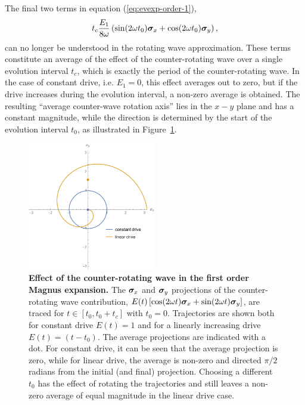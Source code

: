 The final two terms in equation (\ref{eq:evexp-order-1}),
\begin{align}
	t_c \frac{E_1}{8 \omega} \left( \sin(2 \omega t_0) \bm{\sigma}_x + \cos(2 \omega t_0) \bm{\sigma}_y \right),
\end{align}
can no longer be understood in the rotating wave approximation. These terms constitute an average of the effect of the counter-rotating wave over a single evolution interval $t_c$, which is exactly the period of the counter-rotating wave. In the case of constant drive, i.e. $E_1 = 0$, this effect averages out to zero, but if the drive increases during the evolution interval, a non-zero average is obtained. The resulting ``average counter-wave rotation axis'' lies in the $x-y$ plane and has a constant magnitude, while the direction is determined by the start of the evolution interval $t_0$, as illustrated in Figure~\ref{fig:avg-crwave-rotation-lindrive}.

\begin{figure}[tb]
	\centering
	\includegraphics[width=0.5\textwidth]{figures/avg-CR-wave-rotation-lindrive.pdf}
	\caption{\textbf{Effect of the counter-rotating wave in the first order Magnus expansion.} The $\bm{\sigma}_x$ and $\bm{\sigma}_y$ projections of the counter-rotating wave contribution, $E(t) \left[\cos(2 \omega t) \bm{\sigma}_x + \sin(2 \omega t) \bm{\sigma}_y \right]$, are traced for $t \in [t_0,t_0+t_c]$ with $t_0=0$. Trajectories are shown both for constant drive $E(t) = 1$ and for a linearly increasing drive $E(t)=(t-t_0)$. The average projections are indicated with a dot. For constant drive, it can be seen that the average projection is zero, while for linear drive, the average is non-zero and directed $\pi/2$ radians from the initial (and final) projection. Choosing a different $t_0$ has the effect of rotating the trajectories and still leaves a non-zero average of equal magnitude in the linear drive case.}
	\label{fig:avg-crwave-rotation-lindrive}
\end{figure}

